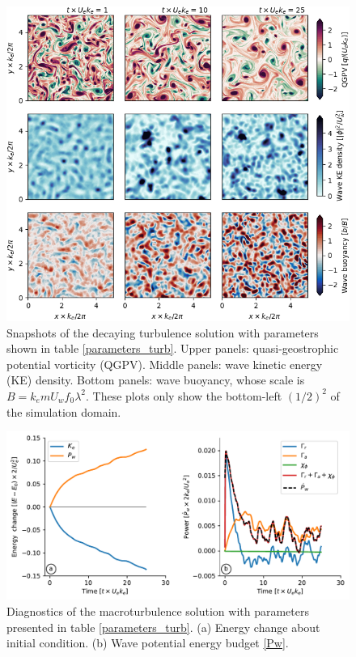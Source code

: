 \documentclass{jfm}
\begin{document}
 \begin{figure}
 \label{snaps_turb}
 \centering
 \includegraphics[width=1.\textwidth]{figs/fig3.png}
 \caption{Snapshots of the decaying turbulence solution with parameters shown in
          table \ref{parameters_turb}. Upper panels: quasi-geostrophic potential vorticity
          (QGPV). Middle panels: wave kinetic energy (KE) density.
         Bottom panels: wave buoyancy, whose scale is $B = k_e m U_w f_0 \lambda^2$.
        These plots only show the bottom-left
        $(1/2)^2$ of the simulation domain.}
 \end{figure}

 \begin{figure}
 \label{stats_turb}
 \centering
 \includegraphics[width=1.\textwidth]{figs/fig4.pdf}
 \caption{Diagnostics of the macroturbulence solution with parameters presented
           in table \ref{parameters_turb}. (a) Energy change about initial condition.
         (b) Wave potential energy budget \eqref{Pw}.
         }
 \end{figure}
\end{document}

